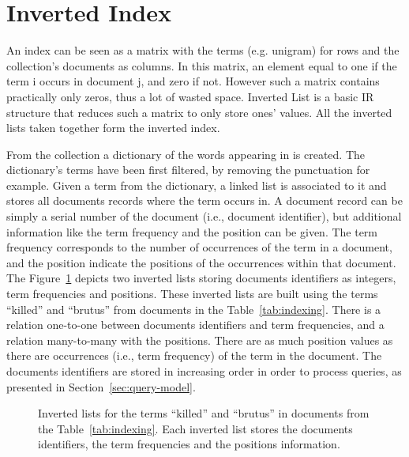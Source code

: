\section{Inverted Index}
\label{sec:inverted-index}

An index can be seen as a matrix with the terms (e.g. unigram) for rows and the
collection's documents as columns. In this matrix, an element
equal to one if the term i occurs in document j, and zero if not. However such
a matrix contains practically only zeros, thus a lot of wasted space. Inverted
List is a basic IR structure that reduces such a matrix to only store ones'
values. All the inverted lists taken together form the inverted index.

From the collection a dictionary of the words appearing in is created. The
dictionary's terms have been first filtered, by removing the punctuation for
example. Given a term from the dictionary, a linked list is associated to it
and stores all documents records where the term occurs in. A document record
can be simply a serial number of the document (i.e., document identifier), but
additional information like the term frequency and the position can be given.
The term frequency corresponds to the number of occurrences of the term in a
document, and the position indicate the positions of the occurrences within
that document. The Figure~\ref{fig:inverted-list} depicts two inverted lists
storing documents identifiers as integers, term frequencies and positions.
These inverted lists are built using the terms ``killed'' and ``brutus'' from
documents in the Table~\ref{tab:indexing}. There
is a relation one-to-one between documents identifiers and term frequencies,
and a relation many-to-many with the positions. There are as much position
values as there are occurrences (i.e., term frequency) of the term in the
document. The documents identifiers are stored in increasing order in order
to process queries, as presented in Section~\ref{sec:query-model}.

\begin{figure}
\centering
{}%
\caption{Inverted lists for the terms ``killed'' and ``brutus'' in documents
from the Table~\ref{tab:indexing}. Each inverted list stores the documents
identifiers, the term frequencies and the positions information.}
\label{fig:inverted-list}
\end{figure}

